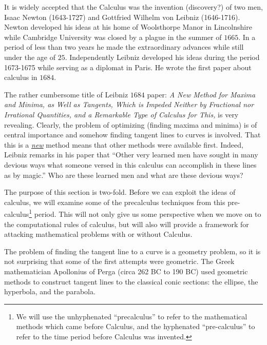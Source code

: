 It is widely accepted that the Calculus was the invention (discovery?)
of two men, Isaac Newton (1643-1727) and Gottfried Wilhelm von Leibniz
(1646-1716). Newton developed his ideas at his home of Woolsthorpe
Manor in Lincolnshire while Cambridge University was closed by a
plague in the summer of $1665.$ In a period of less than two years he
made the extraordinary advances while still under the age of $25.$
Independently Leibniz developed his ideas during the period 1673-1675
while serving as a diplomat in Paris. He wrote the first paper about
calculus in $1684.$


  The rather cumbersome title of Leibniz $1684$ paper: \emph{A New Method for Maxima
  and Minima, as Well as Tangents, Which is Impeded Neither by
  Fractional nor Irrational Quantities, and a Remarkable Type of
  Calculus for This,}  is very revealing.  Clearly,
  the problem of optimizing (finding maxima and minima) is of central
  importance and somehow finding tangent lines to curves is involved.
  That this is a \underline{\emph{new}} method means that other
  methods were available first. Indeed, Leibniz remarks in his paper that
  ``Other very learned men have sought in many devious ways what
  someone versed in this calculus can accomplish in these lines as by
  magic.''  Who are these learned men and what are these devious ways?

  The purpose of this section is two-fold.  Before we can exploit the
  ideas of calculus, we will examine some of the precalculus
  techniques from this pre-calculus\footnote{We will use the
    unhyphenated ``precalculus'' to refer to the mathematical methods
    which came before Calculus, and the hyphenated ``pre-calculus'' to
    refer to the time period before Calculus was invented.} period.
  This will not only give us some perspective when we move on to the
  computational rules of calculus, but will also will provide a
  framework for attacking mathematical problems with or without
  Calculus.


  The problem of finding the tangent line to a curve is a geometry
  problem, so it is not surprising that some of the first attempts
  were geometric. The Greek mathematician Apollonius of Perga (circa
  262 BC to 190 BC) used geometric methods to construct tangent lines to
  the classical conic sections: the ellipse, the hyperbola, and the
  parabola.


